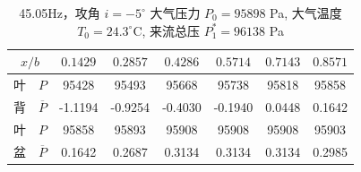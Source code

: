 \begin{table}[H]
  \centering
  \caption[45.05Hz 攻角 $i=-5^\circ$ 实验数据]{45.05Hz，攻角 $i=-5^\circ$ 大气压力 $P_0=95898$ Pa, 大气温度 $T_0=24.3^\circ\text{C}$, 来流总压 $P_1^*=96138$ Pa}
  \label{tab:exp4_45.05Hz_-5}
  \renewcommand{\arraystretch}{1.2}
  
    \begin{tabular}{cccccccc}
      \toprule
      \multicolumn{2}{c}{$x/b$} & $0.1429$ & $0.2857$ & $0.4286$ & $0.5714$ & $0.7143$ & $0.8571$ \\
      \midrule
      叶 & $P$ & 95428 & 95493 & 95668 & 95738 & 95818 & 95858 \\
      背 & $\overline{P}$ & -1.1194 & -0.9254 & -0.4030 & -0.1940 & 0.0448 & 0.1642 \\
      \midrule
      叶 & $P$ & 95858 & 95893 & 95908 & 95908 & 95908 & 95903 \\
      盆 & $\overline{P}$ & 0.1642 & 0.2687 & 0.3134 & 0.3134 & 0.3134 & 0.2985 \\
      \bottomrule
    \end{tabular}
\end{table}